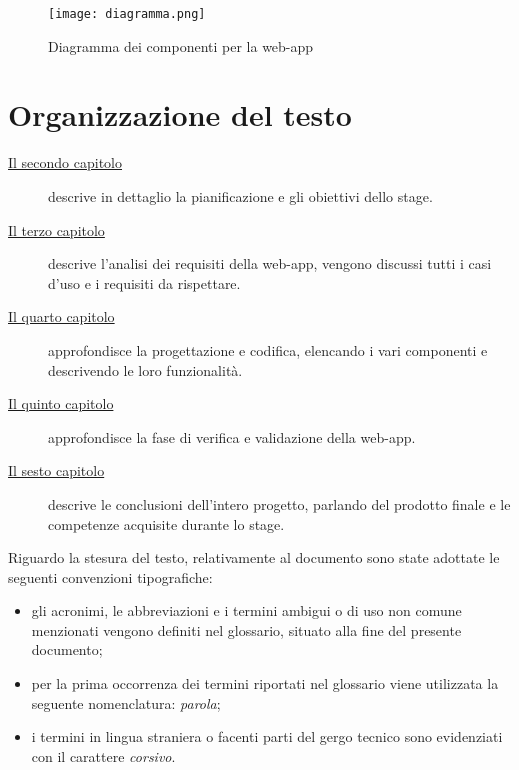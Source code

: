 \begin{figure}[H]
    \centering
    \texttt{[image: diagramma.png]}
    \caption{Diagramma dei componenti per la web-app}
\end{figure}


\section{Organizzazione del testo}

\begin{description}
    \item[{\hyperref[cap:il progetto di stage]{Il secondo capitolo}}] descrive in dettaglio la pianificazione e gli obiettivi dello stage.
    
    \item[{\hyperref[cap:analisi dei requisiti]{Il terzo capitolo}}] descrive l'analisi dei requisiti della web-app, vengono discussi tutti i casi d'uso e i requisiti da rispettare.
    
    \item[{\hyperref[cap:progettazione e codifica]{Il quarto capitolo}}] approfondisce la progettazione e codifica, elencando i vari componenti e descrivendo le loro funzionalità.
    
    
    \item[{\hyperref[cap:verifica]{Il quinto capitolo}}] approfondisce la fase di verifica e validazione della web-app.
    
    \item[{\hyperref[cap:conclusioni]{Il sesto capitolo}}] descrive le conclusioni dell'intero progetto, parlando del prodotto finale e le competenze acquisite durante lo stage.
\end{description}
Riguardo la stesura del testo, relativamente al documento sono state adottate le seguenti convenzioni tipografiche:
\begin{itemize}
	\item gli acronimi, le abbreviazioni e i termini ambigui o di uso non comune menzionati vengono definiti nel glossario, situato alla fine del presente documento;
	\item per la prima occorrenza dei termini riportati nel glossario viene utilizzata la seguente nomenclatura: \emph{parola}\glsfirstoccur;
	\item i termini in lingua straniera o facenti parti del gergo tecnico sono evidenziati con il carattere \emph{corsivo}.
\end{itemize}